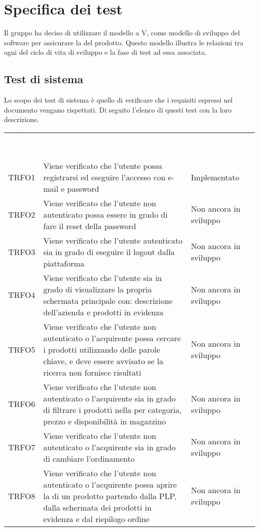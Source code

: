 \section{Specifica dei test}
\label{specificatest}
Il gruppo ha deciso di utilizzare il modello a V, come modello di sviluppo del software per assicurare la  del prodotto. Questo modello illustra le relazioni tra ogni  del ciclo di vita di sviluppo e la fase di test ad essa associata.
\subsection{Test di sistema}
Lo scopo dei test di sistema è quello di verificare che i requisiti espressi nel documento \AdR{} vengano rispettati. Di seguito l'elenco di questi test con la loro descrizione.
\begin{longtable}{|c| C{10cm} |C{3cm}|}
	\textcolor{white}{\textbf{ID Test}}&
	\textcolor{white}{\textbf{Descrizione}}&
	\textcolor{white}{\textbf{Implementato}}\label{tab:TestSistema1}\\
	TRFO1 & Viene verificato che l'utente possa registrarsi ed eseguire l'accesso con e-mail e password & Implementato\\ \hline
	TRFO2 & Viene verificato che l'utente non autenticato possa essere in grado di fare il reset della password & Non ancora in sviluppo\\ \hline
	TRFO3 & Viene verificato che l'utente autenticato sia in grado di eseguire il logout dalla piattaforma & Non ancora in sviluppo\\ \hline
	TRFO4 & Viene verificato che l'utente sia in grado di visualizzare la propria schermata principale con: descrizione dell'azienda e prodotti in evidenza & Non ancora in sviluppo\\ \hline
	TRFO5 & Viene verificato che l'utente non autenticato o l'acquirente possa cercare i prodotti utilizzando delle parole chiave, e deve essere avvisato se la ricerca non fornisce risultati & Non ancora in sviluppo\\ \hline
	TRFO6 & Viene verificato che l'utente non autenticato o l'acquirente sia in grado di filtrare i prodotti nella  per categoria, prezzo e disponibilità in magazzino & Non ancora in sviluppo\\ \hline
	TRFO7 & Viene verificato che l'utente non autenticato o l'acquirente sia in grado di cambiare l'ordinamento & Non ancora in sviluppo\\ \hline
	TRFO8 & Viene verificato che l'utente non autenticato o l'acquirente possa aprire la  di un prodotto partendo dalla PLP, dalla schermata dei prodotti in evidenza e dal riepilogo ordine & Non ancora in sviluppo\\ \hline

\end{longtable}
